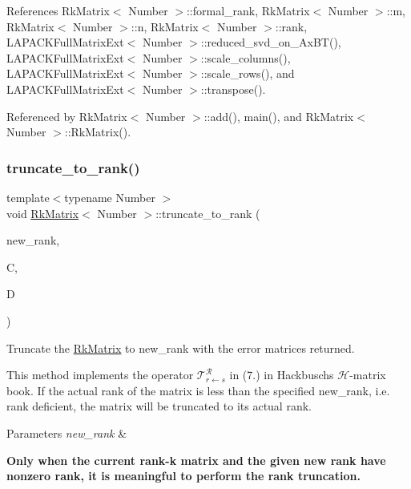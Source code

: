 References Rk\+Matrix$<$ Number $>$\+::formal\+\_\+rank, Rk\+Matrix$<$ Number $>$\+::m, Rk\+Matrix$<$ Number $>$\+::n, Rk\+Matrix$<$ Number $>$\+::rank, L\+A\+P\+A\+C\+K\+Full\+Matrix\+Ext$<$ Number $>$\+::reduced\+\_\+svd\+\_\+on\+\_\+\+Ax\+B\+T(), L\+A\+P\+A\+C\+K\+Full\+Matrix\+Ext$<$ Number $>$\+::scale\+\_\+columns(), L\+A\+P\+A\+C\+K\+Full\+Matrix\+Ext$<$ Number $>$\+::scale\+\_\+rows(), and L\+A\+P\+A\+C\+K\+Full\+Matrix\+Ext$<$ Number $>$\+::transpose().



Referenced by Rk\+Matrix$<$ Number $>$\+::add(), main(), and Rk\+Matrix$<$ Number $>$\+::\+Rk\+Matrix().

\mbox{\label{classRkMatrix_adbaf1dad03ca2fe0ede5bab2315d8859}} 
\subsubsection{\texorpdfstring{truncate\+\_\+to\+\_\+rank()}{truncate\_to\_rank()}\hspace{0.1cm}{\footnotesize\ttfamily [2/2]}}
{\footnotesize\ttfamily template$<$typename Number $>$ \\
void \hyperlink{classRkMatrix}{Rk\+Matrix}$<$ Number $>$\+::truncate\+\_\+to\+\_\+rank (\begin{DoxyParamCaption}\item[{\hyperlink{classRkMatrix_add060bfc3a4cc77f858c3d6dd58cadd5}{size\+\_\+type}}]{new\+\_\+rank,  }\item[{\hyperlink{classLAPACKFullMatrixExt}{L\+A\+P\+A\+C\+K\+Full\+Matrix\+Ext}$<$ Number $>$ \&}]{C,  }\item[{\hyperlink{classLAPACKFullMatrixExt}{L\+A\+P\+A\+C\+K\+Full\+Matrix\+Ext}$<$ Number $>$ \&}]{D }\end{DoxyParamCaption})}

Truncate the \hyperlink{classRkMatrix}{Rk\+Matrix} to {\ttfamily new\+\_\+rank} with the error matrices returned.


\begin{DoxyDescription}
\item[Note ]This method implements the operator $\mathcal{T}_{r \leftarrow s}^{\mathcal{R}}$ in (7.) in Hackbusch\textquotesingle{}s $\mathcal{H}$-\/matrix book. If the actual rank of the matrix is less than the specified {\ttfamily new\+\_\+rank}, i.\+e. rank deficient, the matrix will be truncated to its actual rank. 
\end{DoxyDescription}
\begin{DoxyParams}{Parameters}
{\em new\+\_\+rank} & \\
\hline
\end{DoxyParams}
{\bfseries Only when the current rank-\/k matrix and the given new rank have nonzero rank, it is meaningful to perform the rank truncation.}


